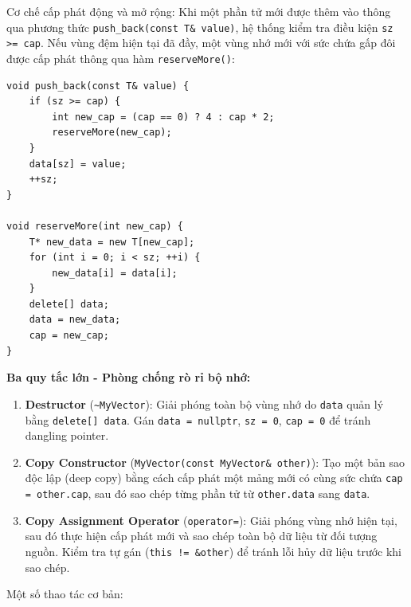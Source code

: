 \documentclass{report}
\begin{document}
Cơ chế cấp phát động và mở rộng: Khi một phần tử mới được thêm vào thông qua phương thức \texttt{push\_back(const T\& value)}, hệ thống kiểm tra điều kiện \texttt{sz >= cap}. Nếu vùng đệm hiện tại đã đầy, một vùng nhớ mới với sức chứa gấp đôi được cấp phát thông qua hàm \texttt{reserveMore()}:

\begin{lstlisting}[caption={Hàm push\_back và reserveMore (File MyDataStructures.h)}, label={lst:pushback}]
void push_back(const T& value) {
    if (sz >= cap) {
        int new_cap = (cap == 0) ? 4 : cap * 2;
        reserveMore(new_cap);
    }
    data[sz] = value;
    ++sz;
}

void reserveMore(int new_cap) {
    T* new_data = new T[new_cap];
    for (int i = 0; i < sz; ++i) {
        new_data[i] = data[i];
    }
    delete[] data;
    data = new_data;
    cap = new_cap;
}
\end{lstlisting}

\textbf{Ba quy tắc lớn - Phòng chống rò rỉ bộ nhớ:}

\begin{enumerate}
    \item \textbf{Destructor} (\texttt{\textasciitilde{}MyVector}): Giải phóng toàn bộ vùng nhớ do \texttt{data} quản lý bằng \texttt{delete[] data}. Gán \texttt{data = nullptr}, \texttt{sz = 0}, \texttt{cap = 0} để tránh dangling pointer.
    \item \textbf{Copy Constructor} (\texttt{MyVector(const MyVector\& other)}): Tạo một bản sao độc lập (deep copy) bằng cách cấp phát một mảng mới có cùng sức chứa \texttt{cap = other.cap}, sau đó sao chép từng phần tử từ \texttt{other.data} sang \texttt{data}.
    \item \textbf{Copy Assignment Operator} (\texttt{operator=}): Giải phóng vùng nhớ hiện tại, sau đó thực hiện cấp phát mới và sao chép toàn bộ dữ liệu từ đối tượng nguồn. Kiểm tra tự gán (\texttt{this != \&other}) để tránh lỗi hủy dữ liệu trước khi sao chép.
\end{enumerate}

Một số thao tác cơ bản:
\end{document}
